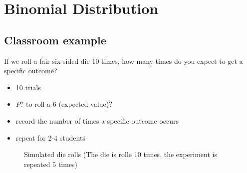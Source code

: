 \documentclass[
  a4paper,
]{scrbook}
\providecommand{\tightlist}{%
  \setlength{\itemsep}{0pt}\setlength{\parskip}{0pt}}\usepackage{longtable,booktabs,array}
\begin{document}
\section{Binomial Distribution}\label{binomial-distribution}

\subsection{Classroom example}\label{classroom-example}

If we roll a fair six-sided die 10 times, how many times do you expect
to get a specific outcome?

\begin{itemize}
\tightlist
\item
  10 trials
\item
  \(P?\) to roll a \(6\) (expected value)?
\item
  record the number of times a specific outcome occurs
\item
  repeat for 2-4 students
\end{itemize}

\begin{figure}[ht]


\caption{\label{fig-sim-dice}Simulated die rolls (The die is rolle
\(10\) times, the experiment is repeated \(5\) times)}

\end{figure}%
\end{document}
